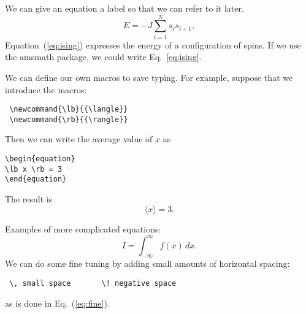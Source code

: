 \documentclass[a4paper,10pt,extramargin]{tubsartcl}
\begin{document}
We can give an equation a label so that we can refer to it later.
\begin{equation}
\label{eq:ising}
E = -J \sum_{i=1}^N s_i s_{i+1} ,
\end{equation}
Equation~(\ref{eq:ising}) expresses the energy of a configuration
of spins.\cite{footnotes} If we use the amsmath package, we could write Eq.~\eqref{eq:ising}.

We can define our own macros to save typing. For example, suppose
that we introduce the macros:
\begin{verbatim}
 \newcommand{\lb}{{\langle}}
 \newcommand{\rb}{{\rangle}}
\end{verbatim}
\newcommand{\lb}{{\langle}}
\newcommand{\rb}{{\rangle}}
Then we can write the average value of $x$ as
\begin{verbatim}
\begin{equation}
\lb x \rb = 3
\end{equation}
\end{verbatim}
The result is
\begin{equation}
\lb x \rb = 3 .
\end{equation}

Examples of more complicated equations:
\begin{equation}
I = \! \int_{-\infty}^\infty f(x)\,dx \label{eq:fine}.
\end{equation}
We can do some fine tuning by adding small amounts of horizontal
spacing:
\begin{verbatim}
 \, small space       \! negative space
\end{verbatim}
as is done in Eq.~(\ref{eq:fine}).
\end{document}
